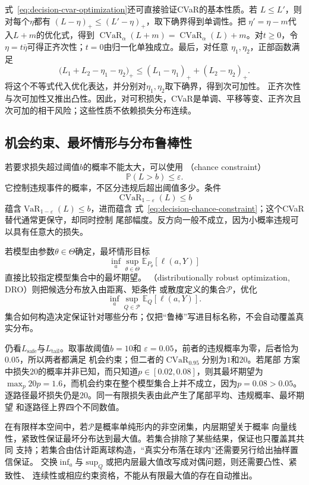 式~\eqref{eq:decision-cvar-optimization}还可直接验证CVaR的基本性质。若
\(L\leq L'\)，则对每个\(\eta\)都有
\((L-\eta)_+\leq(L'-\eta)_+\)，取下确界得到单调性。把
\(\eta'=\eta-m\)代入\(L+m\)的优化式，得到
\(\operatorname{CVaR}_\alpha(L+m)
=\operatorname{CVaR}_\alpha(L)+m\)。对\(t\geq0\)，令
\(\eta=t\bar\eta\)可得正齐次性；\(t=0\)由归一化单独成立。最后，对任意
\(\eta_1,\eta_2\)，正部函数满足
\[
  \bigl(L_1+L_2-\eta_1-\eta_2\bigr)_+
  \leq
  (L_1-\eta_1)_+
  +
  (L_2-\eta_2)_+.
\]
将这个不等式代入优化表达，并分别对\(\eta_1,\eta_2\)取下确界，得到次可加性。
正齐次性与次可加性又推出凸性。因此，对可积损失，CVaR是单调、平移等变、正齐次且
次可加的相干风险；这些性质不依赖损失分布连续。

\subsection{机会约束、最坏情形与分布鲁棒性}
若要求损失超过阈值\(b\)的概率不能太大，可以使用
（chance constraint）
\begin{equation}
  \mathbb{P}(L>b)\leq\varepsilon.
  \label{eq:decision-chance-constraint}
\end{equation}
它控制违规事件的概率，不区分违规后超出阈值多少。条件
\[
  \operatorname{CVaR}_{1-\varepsilon}(L)\leq b
\]
蕴含\(\operatorname{VaR}_{1-\varepsilon}(L)\leq b\)，进而蕴含
式~\eqref{eq:decision-chance-constraint}；这个CVaR替代通常更保守，却同时控制
尾部幅度。反方向一般不成立，因为小概率违规可以具有任意大的损失。

若模型由参数\(\theta\in\Theta\)确定，最坏情形目标
\[
  \inf_a\sup_{\theta\in\Theta}
  \mathbb{E}_{P_\theta}[\ell(a,Y)]
\]
直接比较指定模型集合中的最坏期望。
（distributionally robust optimization, DRO）则把候选分布放入由距离、矩条件
或散度定义的集合\(\mathcal{P}\)，优化
\[
  \inf_a\sup_{Q\in\mathcal{P}}\mathbb{E}_Q[\ell(a,Y)].
\]
集合如何构造决定保证针对哪些分布；仅把“鲁棒”写进目标名称，不会自动覆盖真实分布。

仍看\(L_{\mathrm{safe}}\)与\(L_{\mathrm{tail}}\)。取事故阈值\(b=10\)和
\(\varepsilon=0.05\)，前者的违规概率为零，后者恰为\(0.05\)，所以两者都满足
机会约束；但二者的\(\operatorname{CVaR}_{0.95}\)分别为\(1\)和\(20\)。若尾部
方案中损失\(20\)的概率并非已知，而只知道\(p\in[0.02,0.08]\)，则其最坏期望为
\(\max_p20p=1.6\)，而机会约束在整个模型集合上并不成立，因为\(p=0.08>0.05\)。
逐路径最坏损失仍是\(20\)。同一有限损失表由此产生了尾部平均、违规概率、最坏期望
和逐路径上界四个不同数值。

在有限样本空间中，若\(\mathcal{P}\)是概率单纯形内的非空闭集，内层期望关于概率
向量线性，紧致性保证最坏分布达到最大值。若集合排除了某些结果，保证也只覆盖其共同
支持；若集合由估计距离球构造，“真实分布落在球内”还需要另行给出抽样置信保证。
交换\(\inf_a\)与\(\sup_Q\)或把内层最大值改写成对偶问题，则还需要凸性、紧致性、
连续性或相应约束资格，不能从有限最大值的存在自动推出。

